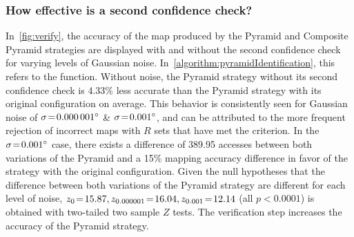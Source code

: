 \subsubsection{How effective is a second confidence check?}
%
%
%
%
%
%

In~\autoref{fig:verify}, the accuracy of the map produced by the Pyramid and Composite Pyramid strategies are displayed with and without the second confidence check for varying levels of Gaussian noise.
In~\autoref{algorithm:pyramidIdentification}, this refers to the  function.
Without noise, the Pyramid strategy without its second confidence check is 4.33\% less accurate than the Pyramid strategy with its original configuration on average.
This behavior is consistently seen for Gaussian noise of $\sigma\!=\!\ang{0.000001}$ \& $\sigma\!=\!\ang{0.001}$, and can be attributed to the more frequent rejection of incorrect maps with $R$ sets that have met the criterion.
In the $\sigma\!=\!\ang{0.001}$ case, there exists a difference of 389.95 accesses between both variations of the Pyramid and a 15\% mapping accuracy difference in favor of the strategy with the original configuration.
Given the null hypotheses that the difference between both variations of the Pyramid strategy are different for each level of noise, $z_0 \!=\! 15.87, z_{0.000001} \!=\! 16.04, z_{0.001} \!=\! 12.14$ (all $p\!<\!0.0001$) is obtained with two-tailed two sample $Z$ tests.
The verification step increases the accuracy of the Pyramid strategy.

